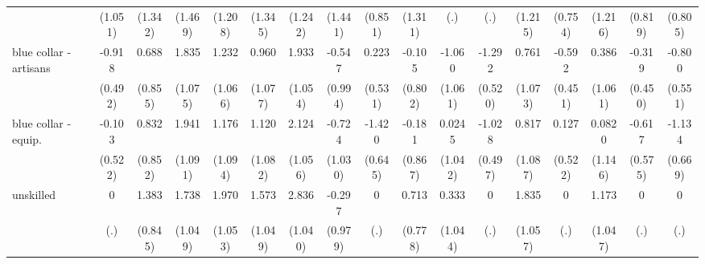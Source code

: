 {\begin{tabular}{l*{16}{c}}
                    &     (1.051)         &     (1.342)         &     (1.469)         &     (1.208)         &     (1.345)         &     (1.242)         &     (1.441)         &     (0.851)         &     (1.311)         &         (.)         &         (.)         &     (1.215)         &     (0.754)         &     (1.216)         &     (0.819)         &     (0.805)         \\
[1em]
blue collar - artisans&      -0.918         &       0.688         &       1.835         &       1.232         &       0.960         &       1.933         &      -0.547         &       0.223         &      -0.105         &      -1.060         &      -1.292\sym{*}  &       0.761         &      -0.592         &       0.386         &      -0.319         &      -0.800         \\
                    &     (0.492)         &     (0.855)         &     (1.075)         &     (1.066)         &     (1.077)         &     (1.054)         &     (0.994)         &     (0.531)         &     (0.802)         &     (1.061)         &     (0.520)         &     (1.073)         &     (0.451)         &     (1.061)         &     (0.450)         &     (0.551)         \\
[1em]
blue collar - equip.&      -0.103         &       0.832         &       1.941         &       1.176         &       1.120         &       2.124\sym{*}  &      -0.724         &      -1.420\sym{*}  &      -0.181         &      0.0245         &      -1.028\sym{*}  &       0.817         &       0.127         &      0.0820         &      -0.617         &      -1.134         \\
                    &     (0.522)         &     (0.852)         &     (1.091)         &     (1.094)         &     (1.082)         &     (1.056)         &     (1.030)         &     (0.645)         &     (0.867)         &     (1.042)         &     (0.497)         &     (1.087)         &     (0.522)         &     (1.146)         &     (0.575)         &     (0.669)         \\
[1em]
unskilled           &           0         &       1.383         &       1.738         &       1.970         &       1.573         &       2.836\sym{**} &      -0.297         &           0         &       0.713         &       0.333         &           0         &       1.835         &           0         &       1.173         &           0         &           0         \\
                    &         (.)         &     (0.845)         &     (1.049)         &     (1.053)         &     (1.049)         &     (1.040)         &     (0.979)         &         (.)         &     (0.778)         &     (1.044)         &         (.)         &     (1.057)         &         (.)         &     (1.047)         &         (.)         &         (.)         \\

\end{tabular}}

